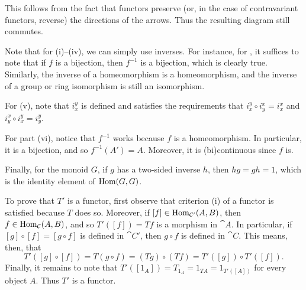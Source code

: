 \documentclass[../../solutions.tex]{subfiles}
\begin{document}
\begin{exercise} \leavevmode
This follows from the fact that functors preserve (or, in the case of contravariant functors, reverse) the directions of the arrows. Thus the resulting diagram still commutes. 
\end{exercise} 

\begin{exercise} \leavevmode
Note that for (i)--(iv), we can simply use inverses. For instance, for \Set, it suffices to note that if $f$ is a bijection, then $f^{-1}$ is a bijection, which is clearly true. Similarly, the inverse of a homeomorphism is a homeomorphism, and the inverse of a group or ring isomorphism is still an isomorphism. 

For (v), note that $i_x^y$ is defined and satisfies the requirements that $i_x^y\circ i_y^x=i_x^x$ and $i_y^x\circ i_x^y=i_y^y$. 

For part (vi), notice that $f^{-1}$ works because $f$ is a homeomorphism. In particular, it is a bijection, and so $f^{-1}(A')=A$. Moreover, it is (bi)continuous since $f$ is. 

Finally, for the monoid $G$, if $g$ has a two-sided inverse $h$, then $hg=gh=1$, which is the identity element of $\operatorname{Hom}(G,G)$. 
\end{exercise} 

\begin{exercise} \leavevmode
To prove that $T'$ is a functor, first observe that criterion (i) of a functor is satisfied because $T$ does so. Moreover, if $[f]\in\operatorname{Hom}_{\mathcal{C}'}(A,B)$, then $f\in\operatorname{Hom}_{\mathcal{C}}(A,B)$, and so $T'([f])=Tf$ is a morphism in $\cat A$. In particular, if $[g]\circ[f]=[g\circ f]$ is defined in $\cat C'$, then $g\circ f$ is defined in $\cat C$. This means, then, that \[T'([g]\circ[f])=T(g\circ f)=(Tg)\circ(Tf)=T'([g])\circ T'([f]).\] Finally, it remains to note that $T'([1_A])=T_{1_A}=1_{TA}=1_{T'([A])}$ for every object $A$. Thus $T'$ is a functor.
\end{exercise} 
\end{document}

